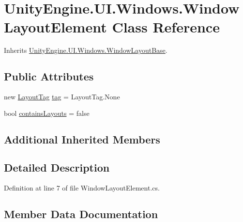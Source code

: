 \hypertarget{class_unity_engine_1_1_u_i_1_1_windows_1_1_window_layout_element}{}\section{Unity\+Engine.\+U\+I.\+Windows.\+Window\+Layout\+Element Class Reference}
\label{class_unity_engine_1_1_u_i_1_1_windows_1_1_window_layout_element}


Inherits \hyperlink{class_unity_engine_1_1_u_i_1_1_windows_1_1_window_layout_base}{Unity\+Engine.\+U\+I.\+Windows.\+Window\+Layout\+Base}.

\subsection*{Public Attributes}
\begin{DoxyCompactItemize}
\item 
new \hyperlink{namespace_unity_engine_1_1_u_i_1_1_windows_a954ff5db0de6295464f3b95598158333}{Layout\+Tag} \hyperlink{class_unity_engine_1_1_u_i_1_1_windows_1_1_window_layout_element_ab09dacf72a3af0032a858cc45842b687}{tag} = Layout\+Tag.\+None
\item 
bool \hyperlink{class_unity_engine_1_1_u_i_1_1_windows_1_1_window_layout_element_abe164c0ebb1b1a5449bb9e54bf6ca707}{contains\+Layouts} = false
\end{DoxyCompactItemize}
\subsection*{Additional Inherited Members}


\subsection{Detailed Description}


Definition at line 7 of file Window\+Layout\+Element.\+cs.



\subsection{Member Data Documentation}
\hypertarget{class_unity_engine_1_1_u_i_1_1_windows_1_1_window_layout_element_abe164c0ebb1b1a5449bb9e54bf6ca707}{}
